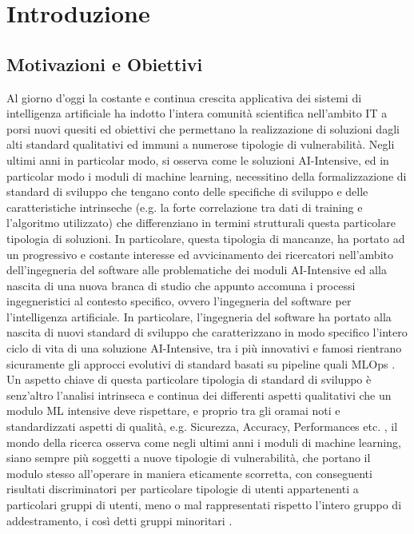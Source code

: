 \chapter{Introduzione}

\section{Motivazioni e Obiettivi} %
Al giorno d'oggi la costante e continua crescita applicativa dei sistemi di intelligenza artificiale ha indotto l'intera comunità scientifica nell'ambito IT a porsi nuovi quesiti ed obiettivi che permettano la realizzazione di soluzioni dagli alti standard qualitativi ed immuni a numerose tipologie di vulnerabilità. Negli ultimi anni in particolar modo, si osserva come le soluzioni AI-Intensive, ed in particolar modo i moduli di machine learning, necessitino della formalizzazione di standard di sviluppo che tengano conto delle specifiche di sviluppo e delle caratteristiche intrinseche (e.g. la forte correlazione tra dati di training e l'algoritmo utilizzato) che differenziano in termini strutturali questa particolare tipologia di soluzioni. In particolare, questa tipologia di mancanze, ha portato ad un progressivo e costante interesse ed avvicinamento dei ricercatori nell'ambito dell'ingegneria del software alle problematiche dei moduli AI-Intensive \cite{rech2004artificial} ed alla nascita di una nuova branca di studio che appunto accomuna i processi ingegneristici al contesto specifico, ovvero l'ingegneria del software per l'intelligenza artificiale.  In particolare, l'ingegneria del software ha portato alla nascita di nuovi standard di sviluppo  che caratterizzano in modo specifico l'intero ciclo di vita di una soluzione AI-Intensive, tra i più innovativi e famosi rientrano sicuramente gli approcci evolutivi di standard basati su pipeline quali MLOps \cite{burkov2020machine}. Un aspetto chiave di questa particolare tipologia di standard di sviluppo è senz'altro l'analisi intrinseca e continua dei differenti aspetti qualitativi che un modulo ML intensive deve rispettare, e proprio tra gli oramai noti e standardizzati aspetti di qualità, e.g. Sicurezza, Accuracy, Performances etc. \cite{NFRForML}, il mondo della ricerca osserva come negli ultimi anni i moduli di machine learning, siano sempre più soggetti a nuove tipologie di vulnerabilità, che portano il modulo stesso all'operare in maniera eticamente scorretta, con conseguenti risultati discriminatori per particolare tipologie di utenti appartenenti a particolari gruppi di utenti, meno o mal rappresentati rispetto l'intero gruppo di addestramento, i così detti gruppi minoritari \cite{brun2018software}. \\

